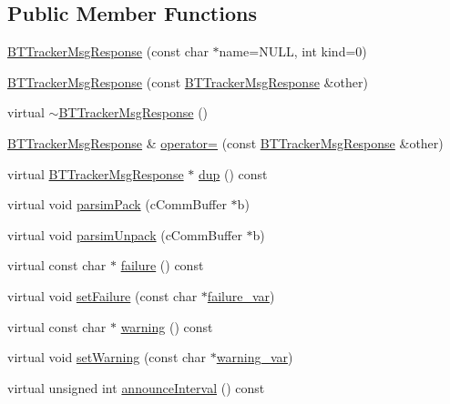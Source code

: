 \subsection*{Public Member Functions}
\begin{DoxyCompactItemize}
\item 
\hyperlink{classBTTrackerMsgResponse_a05ee6c15854cdba8ae16b7807232b016}{B\+T\+Tracker\+Msg\+Response} (const char $\ast$name=N\+U\+L\+L, int kind=0)
\item 
\hyperlink{classBTTrackerMsgResponse_aabeacf4915a545945a63b1f926386e0e}{B\+T\+Tracker\+Msg\+Response} (const \hyperlink{classBTTrackerMsgResponse}{B\+T\+Tracker\+Msg\+Response} \&other)
\item 
virtual \hyperlink{classBTTrackerMsgResponse_a11df55807787aaeac721254f61b85bbe}{$\sim$\+B\+T\+Tracker\+Msg\+Response} ()
\item 
\hyperlink{classBTTrackerMsgResponse}{B\+T\+Tracker\+Msg\+Response} \& \hyperlink{classBTTrackerMsgResponse_a34f2ec6fc48d6110e7846b3f0e7f4f0e}{operator=} (const \hyperlink{classBTTrackerMsgResponse}{B\+T\+Tracker\+Msg\+Response} \&other)
\item 
virtual \hyperlink{classBTTrackerMsgResponse}{B\+T\+Tracker\+Msg\+Response} $\ast$ \hyperlink{classBTTrackerMsgResponse_ac4687cbe3db1cae2e8687827852ca715}{dup} () const 
\item 
virtual void \hyperlink{classBTTrackerMsgResponse_a120681b94c04543563bdd44cb5eb0f49}{parsim\+Pack} (c\+Comm\+Buffer $\ast$b)
\item 
virtual void \hyperlink{classBTTrackerMsgResponse_af6a4a233cf072e92998d91615ab6370f}{parsim\+Unpack} (c\+Comm\+Buffer $\ast$b)
\item 
virtual const char $\ast$ \hyperlink{classBTTrackerMsgResponse_abc7ca44a791c0af1f8ad217ee18fb29d}{failure} () const 
\item 
virtual void \hyperlink{classBTTrackerMsgResponse_af306016f43f2fc54bff1ffafbaea3aac}{set\+Failure} (const char $\ast$\hyperlink{classBTTrackerMsgResponse_a0dc56a9e8c562d00690f9f72ea59b1fd}{failure\+\_\+var})
\item 
virtual const char $\ast$ \hyperlink{classBTTrackerMsgResponse_a66a8fa7e7b230667452d839b290267c9}{warning} () const 
\item 
virtual void \hyperlink{classBTTrackerMsgResponse_a5429f5a7b6bd947aa618d1d0e0e60d47}{set\+Warning} (const char $\ast$\hyperlink{classBTTrackerMsgResponse_a2d586220ffb2eb63253d19dbbce252f8}{warning\+\_\+var})
\item 
virtual unsigned int \hyperlink{classBTTrackerMsgResponse_a48954301e2cdc31321857942f9527b17}{announce\+Interval} () const 

\end{DoxyCompactItemize}
